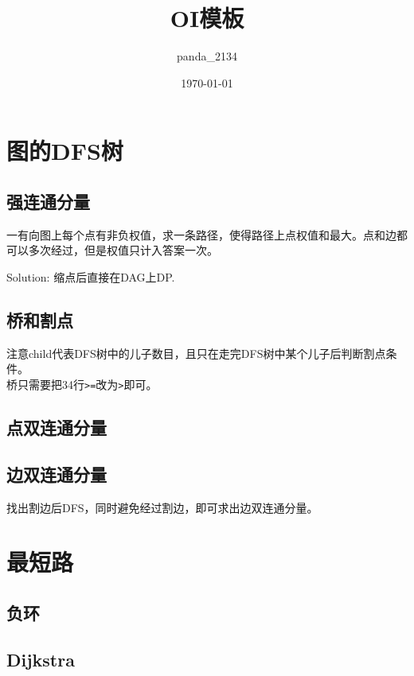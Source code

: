 \documentclass{article}
\title{OI模板}
\author{panda\_2134}
\date{\today}
\begin{document}
	\makeatletter
	\lst@CCPutMacro
    	\@empty\z@\@empty
	\makeatother

	\maketitle
	\newpage
	\tableofcontents
	\newpage

	\section{图的DFS树}
		\subsection{强连通分量}
		
		一有向图上每个点有非负权值，求一条路径，使得路径上点权值和最大。点和边都可以多次经过，但是权值只计入答案一次。
		
		Solution: 缩点后直接在DAG上DP.
		
		
		\subsection{桥和割点}
		注意child代表DFS树中的儿子数目，且只在走完DFS树中某个儿子后判断割点条件。\\
		桥只需要把34行\lstinline|>=|改为\lstinline|>|即可。
		

		\subsection{点双连通分量}
		

		\subsection{边双连通分量}
		找出割边后DFS，同时避免经过割边，即可求出边双连通分量。
	\newpage
	\section{最短路}
		\subsection{负环}
			
		\subsection{Dijkstra}
\end{document}
